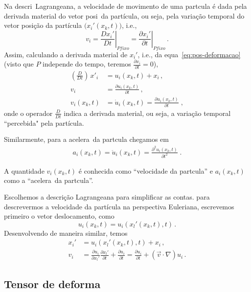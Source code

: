 Na descri\cao\ Lagrangeana, a velocidade de movimento de
uma part\ih cula \'e dada pela derivada material do vetor posi\cao\ da part\'icula,
ou seja, pela varia\c{c}\~ao temporal do vetor posi\c{c}\~ao da
part\'icula $\bigl(x_i'(x_k,t)\bigr)$, i.e.,
\begin{equation}
  v_i=\left. \frac{Dx_i'}{Dt}\right|_{P fixo} =\left. \frac{\partial x_i'}{\partial t}\right|_{P fixo} \, .
\end{equation}
Assim, calculando a derivada material de $x_i'$, i.e., da equa\cao\ \ref{eq:pos-deformacao}
(visto que $P$ independe do tempo, teremos $\frac{\partial x_i}{\partial t}=0$),
\begin{align}
  \left(\frac{D}{Dt}\right)\,x'_i &= u_i(x_k,t) + x_i \, , \\
  v_i &= \frac{\partial u_i(x_k,t)}{\partial t}\, , \\
  v_i(x_k,t) &= \dot{u}_i(x_k,t) = \frac{\partial u_i(x_k,t)}
{\partial t} \; ,
\end{align}
onde o operador $\frac{D}{Dt}$ indica a derivada material, ou seja, a
varia\c{c}\~ao temporal ``percebida" \hspace{1pt} pela part\'icula.

Similarmente, para a acelera\cao\ da part\ih cula chegamos em
\begin{eqnarray}
a_i(x_k,t) = \ddot{u}_i(x_k,t) = \frac{\partial^2 u_i(x_k,t)}
{\partial t^2} \; .
\end{eqnarray}

A quantidade $v_i(x_k,t)$ \'e conhecida como ``velocidade
da part\ih cula'' e $a_i(x_k,t)$ como a ``acelera\cao\ da
part\ih cula''.

Escolhemos a descri\c{c}\~ao Lagrangeana para simplificar as contas.
para descrevermos a velocidade da part\'icula na perspectiva Euleriana,
escrevemos primeiro o vetor deslocamento, como
\begin{equation}
   u_i(x_k,t)=u_i(x_l'(x_k,t),t) \, .
\end{equation}
Desenvolvendo de maneira similar, temos
\begin{align}
  x_i'&=u_i(x_l'(x_k,t),t) +  x_i \, , \\
  v_i &= \frac{\partial u_i}{\partial x_l'}\frac{\partial x_l'}{\partial t}
  +\frac{\partial u_i}{\partial t} = \frac{\partial u_i}{\partial t} +
  (\vec{v}\cdot\nabla)u_i \, .
\end{align}

\subsection{Tensor de deforma\cao}

